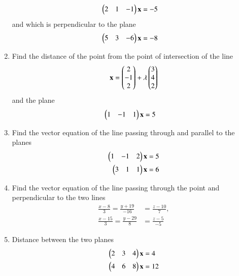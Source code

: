 \begin{enumerate}[label=\arabic*.,ref=\thesubsection.\theenumi]
\begin{align}
\begin{pmatrix}2 & 1 & -1\end{pmatrix}\mathbf{x}&=-5
\end{align}
%
and which is perpendicular to the plane 
\begin{align}
\begin{pmatrix}5 & 3 & -6\end{pmatrix}\mathbf{x}&=-8
\end{align}
%
\item Find the distance of the point  from the point of intersection of the line
%
\begin{align}
\mathbf{x} = \begin{pmatrix}2 \\ -1 \\ 2\end{pmatrix} + \lambda \begin{pmatrix}3 \\ 4 \\ 2\end{pmatrix}  
\end{align}
%
and the plane
%
\begin{align}
\begin{pmatrix}1 & -1 & 1\end{pmatrix}\mathbf{x}&=5
\end{align}
%
\item Find the vector equation of the line passing through  and parallel to the planes 
%
\begin{align}
\begin{pmatrix}1 & -1 & 2\end{pmatrix}\mathbf{x}&=5
\\
\begin{pmatrix}3 & 1 & 1\end{pmatrix}\mathbf{x}&=6
\end{align}
%
\item Find the vector equation of the line passing through the point  and perpendicular to the two lines
\begin{align}
\frac{x-8}{3} = \frac{y+19}{-16} &= \frac{z-10}{7}, 
\\
\frac{x-15}{3} = \frac{y-29}{8} &= \frac{z-5}{-5} 
\end{align}
%
\item Distance between the two planes
%
\begin{align}
\begin{pmatrix}2 & 3 & 4\end{pmatrix}\mathbf{x}&=4
\\
\begin{pmatrix}4 & 6 & 8\end{pmatrix}\mathbf{x}&=12
\end{align}
%
\begin{enumerate}[itemsep=2pt]
\end{enumerate}

\end{enumerate}

